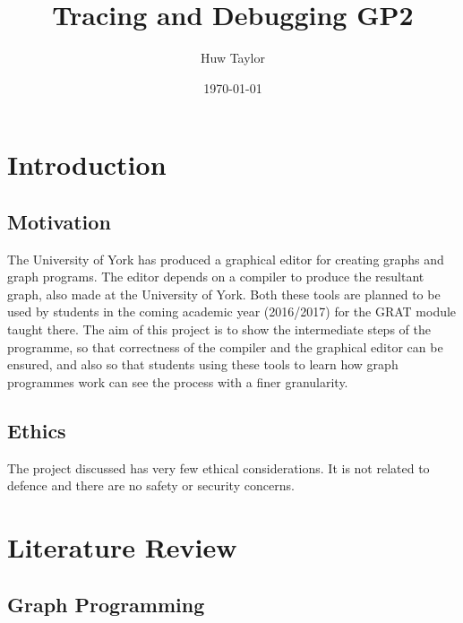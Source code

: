 \documentclass{UoYCSproject}
\author{Huw Taylor}
\title{Tracing and Debugging GP2}
\date{\today}
\begin{document}
\maketitle
\tableofcontents
\listoffigures

\chapter{Introduction}
\section{Motivation}
The University of York has produced a graphical editor for creating graphs and graph programs. The editor depends on a compiler to produce the resultant graph, also made at the University of York. Both these tools are planned to be used by students in the coming academic year (2016/2017) for the GRAT module taught there.
The aim of this project is to show the intermediate steps of the programme, so that correctness of the compiler and the graphical editor can be ensured, and also so that students using these tools to learn how graph programmes work can see the process with a finer granularity.
\section{Ethics}
The project discussed has very few ethical considerations. It is not related to defence and there are no safety or security concerns.

\chapter{Literature Review}
\section{Graph Programming}
\end{document}
